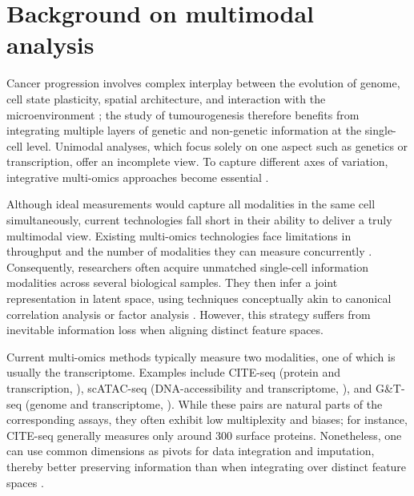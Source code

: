 \section{Background on multimodal analysis}

\label{sec:modalities-multimodal-intro}

Cancer progression involves complex interplay between the evolution of genome, cell state plasticity, spatial architecture, and interaction with the microenvironment ; the study of tumourogenesis therefore benefits from integrating multiple layers of genetic and non-genetic information at the single-cell level. Unimodal analyses, which focus solely on one aspect such as genetics or transcription, offer an incomplete view. To capture different axes of variation, integrative multi-omics approaches become essential \parencite{Nam2021-xt,Baysoy2023-qr}.

Although ideal measurements would capture all modalities in the same cell simultaneously, current technologies fall short in their ability to deliver a truly multimodal view. Existing multi-omics technologies face limitations in throughput and the number of modalities they can measure concurrently \parencite{Baysoy2023-qr}. Consequently, researchers often acquire unmatched single-cell information modalities across several biological samples. They then infer a joint representation in latent space, using techniques conceptually akin to canonical correlation analysis \parencite{Stuart2019-mi} or factor analysis \parencite{Argelaguet2018-oz,Velten2022-gc}. However, this strategy suffers from inevitable information loss when aligning distinct feature spaces.

Current multi-omics methods typically measure two modalities, one of which is usually the transcriptome. Examples include CITE-seq (protein and transcription, \textcite{Stoeckius2017-rz}), scATAC-seq (DNA-accessibility and transcriptome, \textcite{Lareau2019-xr}), and G\&T-seq (genome and transcriptome, \textcite{Macaulay2015-gh}). While these pairs are natural parts of the corresponding assays, they often exhibit low multiplexity and biases; for instance, CITE-seq generally measures only around 300 surface proteins. Nonetheless, one can use common dimensions as pivots for data integration and imputation, thereby better preserving information than when integrating over distinct feature spaces \parencite{Hao2021-qn, Ashuach2023-wq}.

